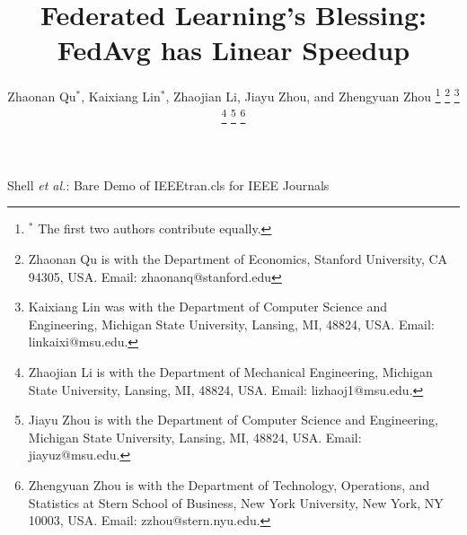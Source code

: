 \documentclass[journal]{IEEEtran}
\begin{document}
\title{Federated Learning's Blessing: FedAvg has Linear Speedup}

\author{Zhaonan Qu$^*$, Kaixiang Lin$^*$, Zhaojian Li, Jiayu Zhou, and Zhengyuan Zhou%
\thanks{$^*$ The first two authors contribute equally.}
\thanks{Zhaonan Qu is with the Department of Economics, Stanford University, CA 94305, USA. Email: {zhaonanq}@stanford.edu}%
\thanks{Kaixiang Lin was with the Department of Computer Science and Engineering, Michigan State University, Lansing, MI, 48824,
USA. Email: {linkaixi}@msu.edu.
}%
\thanks{Zhaojian Li is with the Department of
Mechanical Engineering, Michigan State University, Lansing, MI, 48824,
USA. Email: {lizhaoj1}@msu.edu.}
\thanks{Jiayu Zhou is with the Department of Computer Science and Engineering, Michigan State University, Lansing, MI, 48824,
USA. Email: {jiayuz}@msu.edu.}
\thanks{Zhengyuan Zhou is with the Department of Technology, Operations, and Statistics at Stern School of Business, New York University, New York, NY 10003,
USA. Email: {zzhou}@stern.nyu.edu.}
}



%
{Shell \MakeLowercase{\textit{et al.}}: Bare Demo of IEEEtran.cls for IEEE Journals}

\maketitle
\end{document}
